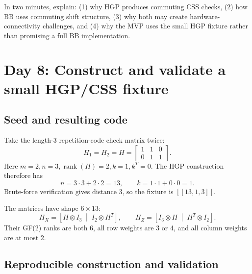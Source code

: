 \documentclass[11pt]{article}
\newcommand{\rank}{\operatorname{rank}}
\begin{document}
\begin{masterybox}[title={Day 7 say-it-aloud prompt}]
In two minutes, explain: (1) why HGP produces commuting CSS checks, (2) how BB uses commuting
shift structure, (3) why both may create hardware-connectivity challenges, and (4) why the MVP uses
the small HGP fixture rather than promising a full BB implementation.
\end{masterybox}

\section{Day 8: Construct and validate a small HGP/CSS fixture}

\subsection{Seed and resulting code}

Take the length-3 repetition-code check matrix twice:
\[
H_1=H_2=H=\begin{bmatrix}1&1&0\\0&1&1\end{bmatrix}.
\]
Here \(m=2,n=3,\rank(H)=2,k=1,k^T=0\). The HGP construction therefore has
\[
n=3\cdot3+2\cdot2=13,\qquad k=1\cdot1+0\cdot0=1.
\]
Brute-force verification gives distance 3, so the fixture is \([[13,1,3]]\).

The matrices have shape \(6\times13\):
\[
H_X=\left[H\otimes I_3\;\middle|\;I_2\otimes H^T\right],\qquad
H_Z=\left[I_3\otimes H\;\middle|\;H^T\otimes I_2\right].
\]
Their GF(2) ranks are both 6, all row weights are 3 or 4, and all column weights are at most 2.

\subsection{Reproducible construction and validation}
\end{document}
